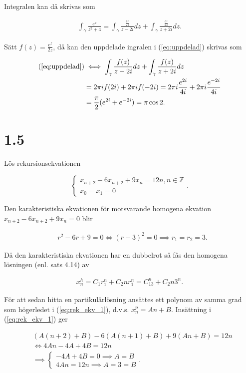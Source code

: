 \documentclass[a4paper]{article}
\begin{document}
Integralen kan då skrivas som

\begin{align}
	\int_\gamma \frac{e^z}{z^2 + 4} = \int_\gamma \frac{\frac{e^z}{2z}}{z-2i}dz + \int_\gamma \frac{\frac{e^z}{2z}}{z+2i}dz.\label{eq:uppdelad}
\end{align}

Sätt $f(z) = \frac{e^z}{2z}$, då kan den uppdelade ingralen i (\ref{eq:uppdelad}) skrivas som

\begin{align*}
	(\ref{eq:uppdelad}) &\iff \int_\gamma \frac{f(z)}{z-2i}dz + \int_\gamma \frac{f(z)}{z+2i}dz\\
		&= 2\pi i f(2i) + 2\pi i f(-2i) = 2\pi i \frac{e^{2i}}{4i} + 2\pi i \frac{e^{-2i}}{4i}\\
		&= \frac{\pi}{2}(e^{2i} + e^{-2i}) = \pi\cos 2.
\end{align*}

\section*{1.5}

Lös rekursionsekvationen

\begin{equation}
	\begin{cases}
		x_{n+2} - 6x_{n+2} + 9x_n = 12n, n \in \mathbb{Z}\\
		x_0 = x_1 = 0
	\end{cases}\label{eq:rek_ekv_1}.
\end{equation}

Den karakteristiska ekvationen för motsvarande homogena ekvation $x_{n+2} - 6x_{n+2} + 9x_n = 0$ blir

\begin{align*}
	&r^2 - 6r + 9 = 0 \iff (r - 3)^2 = 0 \implies r_1 = r_2 = 3.
\end{align*}

Då den karakteristiska ekvationen har en dubbelrot så fås den homogena lösningen (enl. sats 4.14) av

\begin{align*}
	x_n^h = C_1r_1^n + C_2nr_1^n = C_13^n + C_2n3^n.
\end{align*}

För att sedan hitta en partikulärlösning ansättes ett polynom av samma grad som högerledet i (\ref{eq:rek_ekv_1}), d.v.s. $x_n^p = An + B$. Insättning i (\ref{eq:rek_ekv_1}) ger

\begin{align*}
	&(A(n+2) + B) - 6(A(n+1) + B) + 9(An + B) = 12n\\
	&\iff 4An - 4A + 4B = 12n\\
	&\implies	\begin{cases}
					-4A + 4B = 0 \implies A = B\\
					4An = 12n \implies A = 3 = B
				\end{cases}.
\end{align*}
\end{document}
